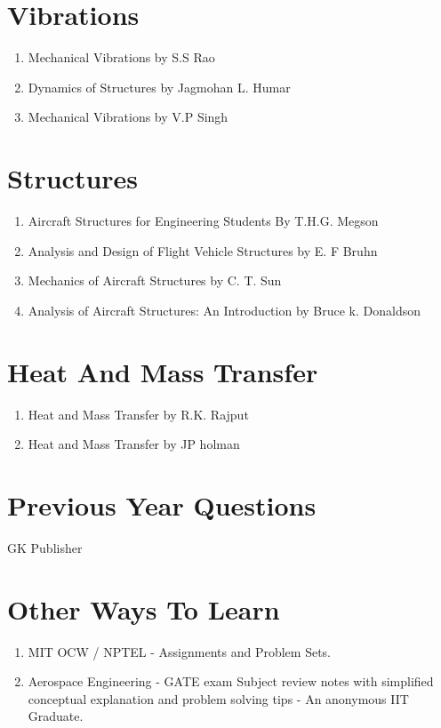 \section{Vibrations}
\begin{enumerate}
  \item Mechanical Vibrations by S.S Rao
  \item Dynamics of Structures by Jagmohan L. Humar
  \item Mechanical Vibrations by V.P Singh
\end{enumerate}

\section{Structures}
\begin{enumerate}
  \item Aircraft Structures for Engineering Students By T.H.G. Megson
  \item Analysis and Design of Flight Vehicle Structures by E. F Bruhn
  \item Mechanics of Aircraft Structures by C. T. Sun
  \item Analysis of Aircraft Structures: An Introduction by Bruce k. Donaldson
\end{enumerate}

\section{Heat And Mass Transfer}
\begin{enumerate}
  \item Heat and Mass Transfer by R.K. Rajput
  \item Heat and Mass Transfer by JP holman
\end{enumerate}

\section{Previous Year Questions}
GK Publisher

\section{Other Ways To Learn}
\begin{enumerate}
  \item MIT OCW / NPTEL - Assignments and Problem Sets.
  \item Aerospace Engineering - GATE exam Subject review notes with simplified conceptual explanation and problem solving tips - An anonymous IIT Graduate.
\end{enumerate}

